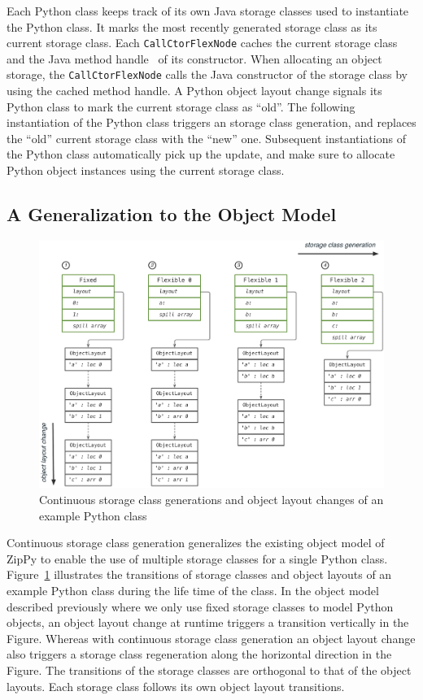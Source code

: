 Each Python class keeps track of its own Java storage classes used to instantiate the Python class.
It marks the most recently generated storage class as its current storage class.
Each \texttt{CallCtorFlexNode} caches the current storage class and the Java method handle~\cite{jdk8} of its constructor.
When allocating an object storage, the \texttt{CallCtorFlexNode} calls the Java constructor of the storage class by using the cached method handle.
A Python object layout change signals its Python class to mark the current storage class as ``old''.
The following instantiation of the Python class triggers an storage class generation, and replaces the ``old'' current storage class with the ``new'' one.
Subsequent instantiations of the Python class automatically pick up the update, and make sure to allocate Python object instances using the current storage class.

\subsection{A Generalization to the Object Model}

\begin{figure}
\centering
\includegraphics[scale=.49]{figures/object-storage-class-generation-and-object-layout-change}
\caption{Continuous storage class generations and object layout changes of an example Python class}
\label{fig:impl-object-storage-class-generation-and-object-layout-change}
\end{figure}

Continuous storage class generation generalizes the existing object model of ZipPy to enable the use of multiple storage classes for a single Python class.
Figure~\ref{fig:impl-object-storage-class-generation-and-object-layout-change} illustrates the transitions of storage classes and object layouts of an example Python class during the life time of the class.
In the object model described previously where we only use fixed storage classes to model Python objects, an object layout change at runtime triggers a transition vertically in the Figure.
Whereas with continuous storage class generation an object layout change also triggers a storage class regeneration along the horizontal direction in the Figure.
The transitions of the storage classes are orthogonal to that of the object layouts.
Each storage class follows its own object layout transitions.

